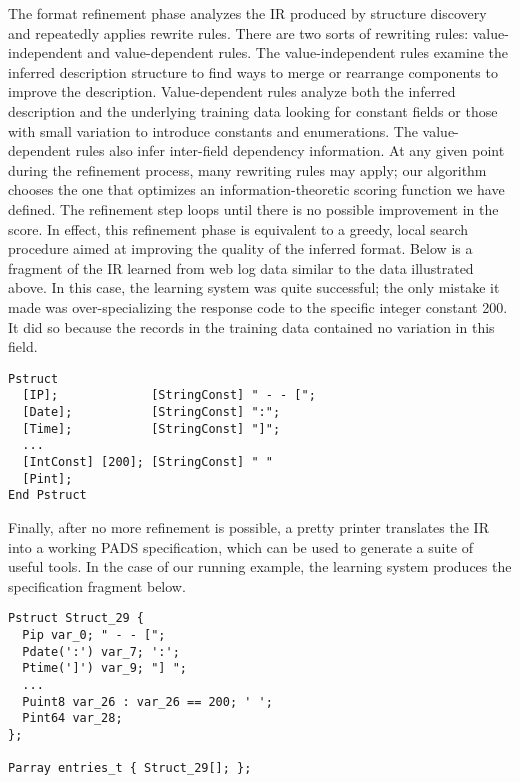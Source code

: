 \documentclass{article}
\begin{document}
The format refinement phase analyzes the IR produced by structure discovery
and repeatedly applies 
rewrite rules.  There are two sorts of rewriting rules: 
value-independent and value-dependent rules.
The value-independent rules examine the inferred description structure
to find ways to merge or rearrange components to improve the description.
Value-dependent rules analyze both the inferred description and the underlying
training data looking for constant fields or those with small
variation to introduce constants and enumerations.
The value-dependent rules also infer
inter-field dependency information.
At any given point during the refinement process,
many rewriting rules may apply; our algorithm chooses the one 
that optimizes an information-theoretic
scoring function we have defined.
The refinement step loops until there is no possible
improvement in the score. 
In effect, this refinement phase is equivalent to a greedy, local search
procedure aimed at improving the quality of the inferred format.
Below is a fragment of the IR learned from web log data similar to the data
illustrated above.  In this case, the learning system was quite successful;  the only mistake it
made was over-specializing the response code 
to the specific integer constant 200.  It did so because the 
records in the training data contained no variation in this field.

{\small
\begin{verbatim}
Pstruct
  [IP];             [StringConst] " - - [";
  [Date];           [StringConst] ":";
  [Time];           [StringConst] "]";
  ...
  [IntConst] [200]; [StringConst] " " 
  [Pint];
End Pstruct
\end{verbatim}
}
Finally, after no more refinement is possible, a pretty printer 
translates the IR into a working PADS 
specification,  which can be used to generate
a suite of useful tools.  In the case of our running example,
the learning system produces the specification fragment below.

{\small
\begin{verbatim}
Pstruct Struct_29 {
  Pip var_0; " - - [";
  Pdate(':') var_7; ':';
  Ptime(']') var_9; "] ";
  ...
  Puint8 var_26 : var_26 == 200; ' ';
  Pint64 var_28;
};

Parray entries_t { Struct_29[]; };
\end{verbatim}
}



\end{document}
